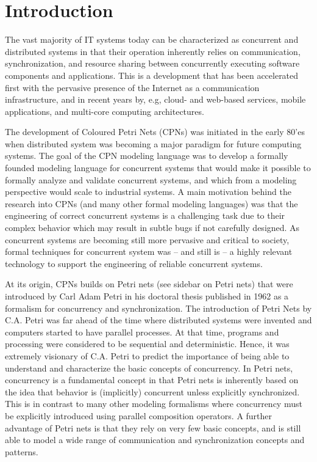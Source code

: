 \section{Introduction}

The vast majority of IT systems today can be characterized as
concurrent and distributed systems in that their operation inherently
relies on communication, synchronization, and resource sharing between
concurrently executing software components and applications. This is a
development that has been accelerated first with the pervasive
presence of the Internet as a communication infrastructure, and in
recent years by, e.g, cloud- and web-based services, mobile
applications, and multi-core computing architectures.


The development of Coloured Petri Nets (CPNs) was initiated in the
early 80'es when distributed system was becoming a major paradigm for
future computing systems. The goal of the CPN modeling language was to
develop a formally founded modeling language for concurrent systems
that would make it possible to formally analyze and validate
concurrent systems, and which from a modeling perspective would scale
to industrial systems. A main motivation behind the research into CPNs
(and many other formal modeling languages) was that the engineering of
correct concurrent systems is a challenging task due to their complex
behavior which may result in subtle bugs if not carefully designed. As
concurrent systems are becoming still more pervasive and critical to
society, formal techniques for concurrent system was -- and still is
-- a highly relevant technology to support the engineering of reliable
concurrent systems.


At its origin, CPNs builds on Petri nets (see sidebar on Petri nets)
that were introduced by Carl Adam Petri in his doctoral thesis
published in 1962 \cite{capetri:thesis} as a formalism for concurrency
and synchronization. The introduction of Petri Nets by C.A. Petri was
far ahead of the time where distributed systems were invented and
computers started to have parallel processes. At that time, programs
and processing were considered to be sequential and
deterministic. Hence, it was extremely visionary of C.A. Petri to
predict the importance of being able to understand and characterize
the basic concepts of concurrency. In Petri nets, concurrency is a
fundamental concept in that Petri nets is inherently based on the idea
that behavior is (implicitly) concurrent unless explicitly
synchronized. This is in contrast to many other modeling formalisms
where concurrency must be explicitly introduced using parallel
composition operators. A further advantage of Petri nets is that they
rely on very few basic concepts, and is still able to model a wide
range of communication and synchronization concepts and patterns.\\

